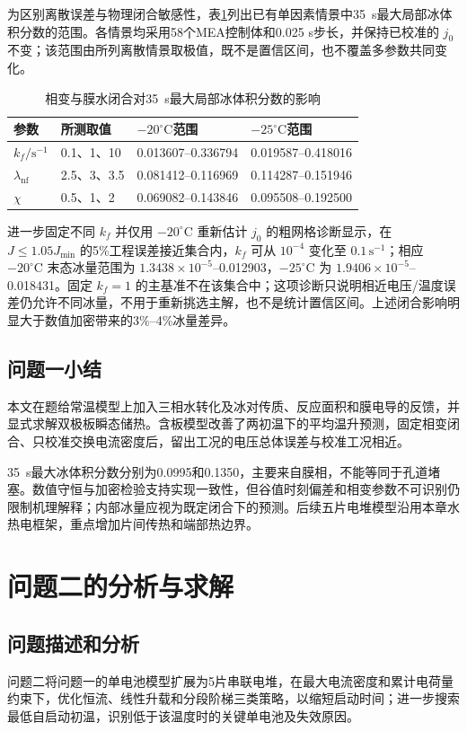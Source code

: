 \documentclass[bwprint]{gmcmthesis}
\numberwithin{equation}{section}
\numberwithin{figure}{section}
\begin{document}
为区别离散误差与物理闭合敏感性，表\ref{tab:q1_sensitivity}列出已有单因素情景中35~s最大局部冰体积分数的范围。各情景均采用58个MEA控制体和0.025 s步长，并保持已校准的 $j_0$ 不变；该范围由所列离散情景取极值，既不是置信区间，也不覆盖多参数共同变化。
\begin{table}[htbp]
\centering
\caption{相变与膜水闭合对35~s最大局部冰体积分数的影响}
\label{tab:q1_sensitivity}
\small
\begin{tabular}{llll}
\toprule
参数 & 所测取值 & $-20^\circ\mathrm C$范围 & $-25^\circ\mathrm C$范围\\
\midrule
$k_f/\mathrm{s^{-1}}$ & 0.1、1、10 & 0.013607--0.336794 & 0.019587--0.418016\\
$\lambda_{\mathrm{nf}}$ & 2.5、3、3.5 & 0.081412--0.116969 & 0.114287--0.151946\\
$\chi$ & 0.5、1、2 & 0.069082--0.143846 & 0.095508--0.192500\\
\bottomrule
\end{tabular}
\end{table}

进一步固定不同 $k_f$ 并仅用 $-20^\circ\mathrm C$ 重新估计 $j_0$ 的粗网格诊断显示，在 $J\le1.05J_{\min}$ 的5\%工程误差接近集合内，$k_f$ 可从 $10^{-4}$ 变化至 $0.1\,\mathrm{s^{-1}}$；相应 $-20^\circ\mathrm C$ 末态冰量范围为 $1.3438\times10^{-5}$--0.012903，$-25^\circ\mathrm C$ 为 $1.9406\times10^{-5}$--0.018431。固定 $k_f=1$ 的主基准不在该集合中；这项诊断只说明相近电压/温度误差仍允许不同冰量，不用于重新挑选主解，也不是统计置信区间。上述闭合影响明显大于数值加密带来的3\%--4\%冰量差异。

\subsection{问题一小结}
本文在题给常温模型上加入三相水转化及冰对传质、反应面积和膜电导的反馈，并显式求解双极板瞬态储热。含板模型改善了两初温下的平均温升预测，固定相变闭合、只校准交换电流密度后，留出工况的电压总体误差与校准工况相近。

35~s最大冰体积分数分别为0.0995和0.1350，主要来自膜相，不能等同于孔道堵塞。数值守恒与加密检验支持实现一致性，但谷值时刻偏差和相变参数不可识别仍限制机理解释；内部冰量应视为既定闭合下的预测。后续五片电堆模型沿用本章水热电框架，重点增加片间传热和端部热边界。

\section{问题二的分析与求解}
\subsection{问题描述和分析}
问题二将问题一的单电池模型扩展为5片串联电堆，在最大电流密度和累计电荷量约束下，优化恒流、线性升载和分段阶梯三类策略，以缩短启动时间；进一步搜索最低自启动初温，识别低于该温度时的关键单电池及失效原因。
\end{document}
